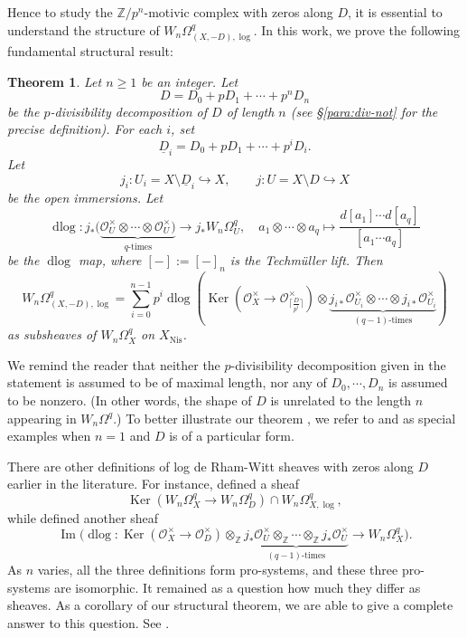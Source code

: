 \documentclass[11pt]{amsart}
\newcommand{\ra}{\rightarrow}
\newcommand{\Z}{\mathbb{Z}}
\newcommand{\cO}{\mathcal{O}}
\newcommand{\Ker}{\operatorname{Ker}}
\renewcommand{\Im}{\operatorname{Im}}
\newcommand{\dlog}{\operatorname{dlog}}
\newcommand{\hra}{\hookrightarrow}
\newcommand{\Nis}{{\operatorname{Nis}}}
\newcommand{\ul}{\underline}
\theoremstyle{plain}
\newtheorem{thm}[prop]{Theorem}
\theoremstyle{definition}
\numberwithin{equation}{prop}
\begin{document}
Hence to study the $\Z/p^n$-motivic complex with zeros along $D$, it is essential to understand the structure of $W_n\Omega^q_{(X,-D),\log}$.
In this work, we prove the following fundamental structural result:
\begin{thm}\label{thm0}
Let $n\ge 1$ be an integer.
Let $$D=D_0+pD_1+\cdots +p^{n}D_{n}$$ be the $p$-divisibility decomposition of $D$ of length $n$ (see \S\ref{para:div-not} for the precise definition).
For each $i$, set
$$\ul D_i=D_0+pD_1+\cdots + p^iD_i.$$
Let
$$j_i:U_i=X\setminus \ul D_i\hra X,\qquad
j:U=X\setminus D\hra X$$ be the open immersions.
Let 
$$\dlog:j_*(\underbrace{\cO_{U}^\times \otimes \cdots \otimes \cO_{U}^\times)}_{q\text{-times}}
\ra j_*W_{n}\Omega^q_U,\quad 
a_1\otimes \cdots\otimes a_q\mapsto \frac{d[a_1]\cdots d[a_q]}{[a_1\cdots a_q]}$$
be the $\dlog$ map, where $[-]:=[-]_{n}$ is the Techm\"uller lift.
Then
$$W_n\Omega^q_{(X,-D),\log}=\sum_{i=0}^{n-1} 
 p^i \dlog\left(
 \Ker(\cO_X^\times\ra \cO_{ \lceil\frac{D}{p^i}\rceil}^ \times)\otimes
\underbrace{ j_{i*}\cO_{U_i}^\times \otimes \cdots \otimes j_{i*}\cO_{U_i}^\times}_{(q-1)\text{-times}} \right)$$
as subsheaves of $W_n\Omega^q_X$ on $X_\Nis$.
\end{thm}
We remind the reader that neither the $p$-divisibility decomposition given in the statement is  assumed to be of maximal length, nor any of $D_0,\cdots,D_n$ is assumed to be nonzero.
(In other words, the shape of $D$ is unrelated to the length $n$ appearing in $W_n\Omega^q$.)
To better illustrate our theorem , we refer to  and  as special examples when $n=1$ and $D$ is of a particular form.


There are other definitions of log de Rham-Witt sheaves with zeros along $D$ earlier in the literature. 
For instance, \cite{Gupta-Krishna} defined a sheaf
$$\Ker(W_n\Omega^q_X\ra W_n\Omega^q_D)\cap W_n\Omega^q_{X,\log},$$
while \cite{JSZ} defined another sheaf
$$\Im\Big(\dlog: \Ker(\cO_X^\times\ra \cO_D^\times)
\otimes_{\Z} \underbrace{j_*\cO_U^\times\otimes_{\Z}\cdots \otimes_{\Z} j_*\cO_U^\times}_{(q-1)\text{-times}}
\ra W_n\Omega^q_X\Big).$$
As $n$ varies, all the three definitions form pro-systems, and these three pro-systems are isomorphic. 
It remained as a question how much they differ as sheaves. 
As a corollary of our structural theorem, we are able to give a complete answer to this question.
See .
\end{document}
